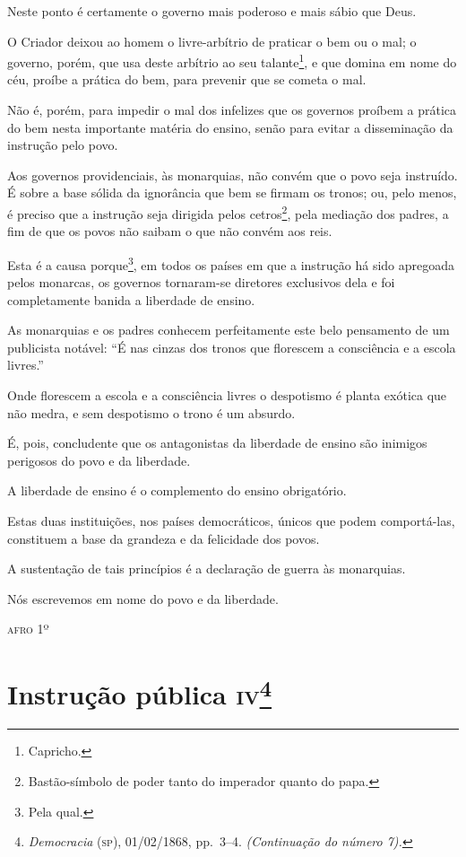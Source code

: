 Neste ponto é certamente o governo mais poderoso e mais sábio que Deus.

O Criador deixou ao homem o livre-arbítrio de praticar o bem ou o mal; o
governo, porém, que usa deste arbítrio ao seu talante\footnote{
  Capricho.}, e que domina em nome do céu, proíbe a prática do bem, para
prevenir que se cometa o mal.

Não é, porém, para impedir o mal dos infelizes que os governos proíbem a
prática do bem nesta importante matéria do ensino, senão para evitar a
disseminação da instrução pelo povo.

Aos governos providenciais, às monarquias, não convém que o povo seja
instruído. É sobre a base sólida da ignorância que bem se firmam os
tronos; ou, pelo menos, é preciso que a instrução seja dirigida pelos
cetros\footnote{Bastão-símbolo de poder tanto do imperador quanto do
  papa.}, pela mediação dos padres, a fim de que os povos não saibam o
que não convém aos reis.

Esta é a causa porque\footnote{Pela qual.}, em todos os países em que
a instrução há sido apregoada pelos monarcas, os governos tornaram-se
diretores exclusivos dela e foi completamente banida a liberdade de
ensino.

As monarquias e os padres conhecem perfeitamente este belo pensamento de
um publicista notável: ``É nas cinzas dos tronos que florescem a
consciência e a escola livres.''

Onde florescem a escola e a consciência livres o despotismo é planta
exótica que não medra, e sem despotismo o trono é um absurdo.

É, pois, concludente que os antagonistas da liberdade de ensino são
inimigos perigosos do povo e da liberdade.

A liberdade de ensino é o complemento do ensino obrigatório.

Estas duas instituições, nos países democráticos, únicos que podem
comportá-las, constituem a base da grandeza e da felicidade dos povos.

A sustentação de tais princípios é a declaração de guerra às monarquias.

Nós escrevemos em nome do povo e da liberdade.

\begin{flushright}
\textsc{afro} 1º
\end{flushright}

\chapter{Instrução pública \textsc{iv}\footnote{\emph{Democracia} (\textsc{sp}),
  01/02/1868, pp.~3--4. \emph{(Continuação do número 7).}}}

